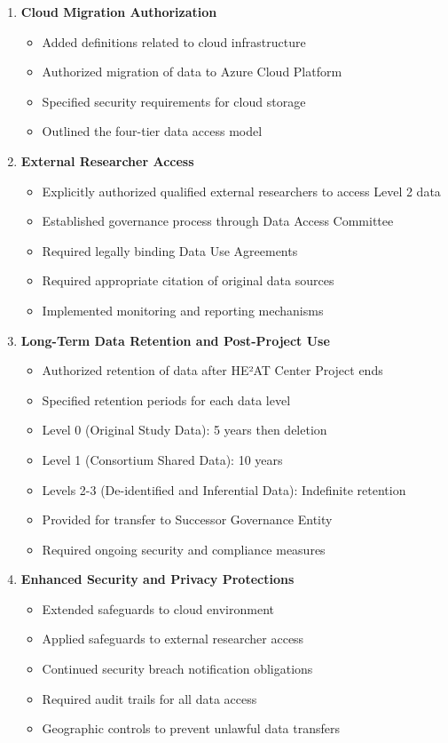 \documentclass[12pt,letterpaper]{article}
\begin{document}
\begin{enumerate}
\item \textbf{Cloud Migration Authorization}
   \begin{itemize}
   \item Added definitions related to cloud infrastructure
   \item Authorized migration of data to Azure Cloud Platform
   \item Specified security requirements for cloud storage
   \item Outlined the four-tier data access model
   \end{itemize}

\item \textbf{External Researcher Access}
   \begin{itemize}
   \item Explicitly authorized qualified external researchers to access Level 2 data
   \item Established governance process through Data Access Committee
   \item Required legally binding Data Use Agreements
   \item Required appropriate citation of original data sources
   \item Implemented monitoring and reporting mechanisms
   \end{itemize}

\item \textbf{Long-Term Data Retention and Post-Project Use}
   \begin{itemize}
   \item Authorized retention of data after HE²AT Center Project ends
   \item Specified retention periods for each data level
   \item Level 0 (Original Study Data): 5 years then deletion
   \item Level 1 (Consortium Shared Data): 10 years
   \item Levels 2-3 (De-identified and Inferential Data): Indefinite retention
   \item Provided for transfer to Successor Governance Entity
   \item Required ongoing security and compliance measures
   \end{itemize}

\item \textbf{Enhanced Security and Privacy Protections}
   \begin{itemize}
   \item Extended safeguards to cloud environment
   \item Applied safeguards to external researcher access
   \item Continued security breach notification obligations
   \item Required audit trails for all data access
   \item Geographic controls to prevent unlawful data transfers
   \end{itemize}


\end{enumerate}
\end{document}
